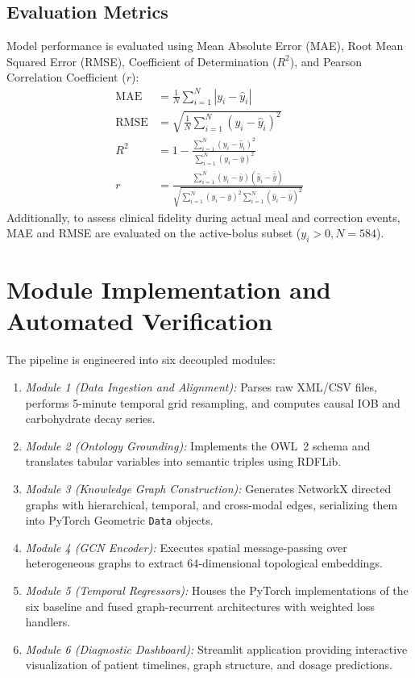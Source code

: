 \documentclass[10pt,a4paper]{article}
\begin{document}
\subsection{Evaluation Metrics}
Model performance is evaluated using Mean Absolute Error (MAE), Root Mean Squared Error (RMSE), Coefficient of Determination ($R^2$), and Pearson Correlation Coefficient ($r$):
\begin{align}
\mathrm{MAE} &= \frac{1}{N}\sum_{i=1}^N |y_i - \hat{y}_i| \\
\mathrm{RMSE} &= \sqrt{\frac{1}{N}\sum_{i=1}^N (y_i - \hat{y}_i)^2} \\
R^2 &= 1 - \frac{\sum_{i=1}^N (y_i - \hat{y}_i)^2}{\sum_{i=1}^N (y_i - \bar{y})^2} \\
r &= \frac{\sum_{i=1}^N (y_i - \bar{y})(\hat{y}_i - \bar{\hat{y}})}{\sqrt{\sum_{i=1}^N (y_i - \bar{y})^2 \sum_{i=1}^N (\hat{y}_i - \bar{\hat{y}})^2}}
\end{align}
Additionally, to assess clinical fidelity during actual meal and correction events, MAE and RMSE are evaluated on the active-bolus subset ($y_i > 0, N = 584$).

\section{Module Implementation and Automated Verification}
The pipeline is engineered into six decoupled modules:
\begin{enumerate}
    \item \textit{Module 1 (Data Ingestion and Alignment):} Parses raw XML/CSV files, performs 5-minute temporal grid resampling, and computes causal IOB and carbohydrate decay series.
    \item \textit{Module 2 (Ontology Grounding):} Implements the OWL~2 schema and translates tabular variables into semantic triples using RDFLib.
    \item \textit{Module 3 (Knowledge Graph Construction):} Generates NetworkX directed graphs with hierarchical, temporal, and cross-modal edges, serializing them into PyTorch Geometric \texttt{Data} objects.
    \item \textit{Module 4 (GCN Encoder):} Executes spatial message-passing over heterogeneous graphs to extract 64-dimensional topological embeddings.
    \item \textit{Module 5 (Temporal Regressors):} Houses the PyTorch implementations of the six baseline and fused graph-recurrent architectures with weighted loss handlers.
    \item \textit{Module 6 (Diagnostic Dashboard):} Streamlit application providing interactive visualization of patient timelines, graph structure, and dosage predictions.
\end{enumerate}
\end{document}
